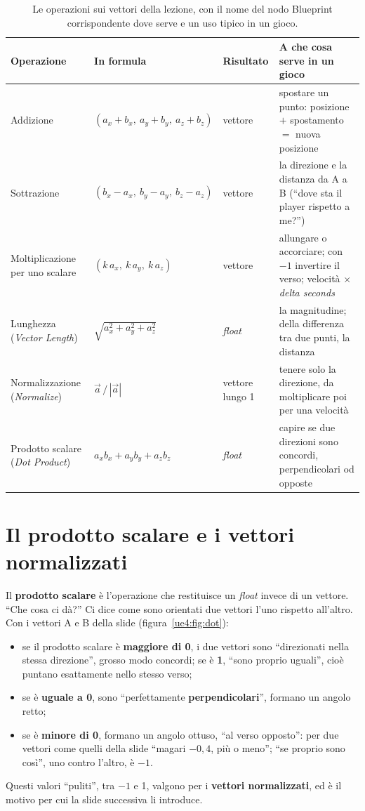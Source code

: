 \begin{table}[htbp]
\centering
\small
\begin{tabular}{@{}p{3.1cm}p{3.4cm}p{2.0cm}p{5.6cm}@{}}
\toprule
\textbf{Operazione} & \textbf{In formula} & \textbf{Risultato} &
\textbf{A che cosa serve in un gioco} \\
\midrule
Addizione & $(a_x+b_x,\ a_y+b_y,\ a_z+b_z)$ & vettore & spostare un punto: posizione
$+$ spostamento $=$ nuova posizione \\
Sottrazione & $(b_x-a_x,\ b_y-a_y,\ b_z-a_z)$ & vettore & la direzione e la distanza
da A a B (``dove sta il player rispetto a me?'') \\
Moltiplicazione per uno scalare & $(k\,a_x,\ k\,a_y,\ k\,a_z)$ & vettore & allungare o
accorciare; con $-1$ invertire il verso; velocità $\times$ \emph{delta seconds} \\
Lunghezza (\emph{Vector Length}) & $\sqrt{a_x^2+a_y^2+a_z^2}$ & \emph{float} & la
magnitudine; della differenza tra due punti, la distanza \\
Normalizzazione (\emph{Normalize}) & $\vec a \,/\, |\vec a|$ & vettore lungo 1 & tenere
solo la direzione, da moltiplicare poi per una velocità \\
Prodotto scalare (\emph{Dot Product}) & $a_x b_x + a_y b_y + a_z b_z$ & \emph{float} &
capire se due direzioni sono concordi, perpendicolari od opposte \\
\bottomrule
\end{tabular}
\caption{Le operazioni sui vettori della lezione, con il nome del nodo Blueprint
corrispondente dove serve e un uso tipico in un gioco.}
\label{ue4:tab:vettori}
\end{table}

\section{Il prodotto scalare e i vettori normalizzati}
\label{ue4:sec:dot}

Il \textbf{prodotto scalare} è l'operazione che restituisce un \emph{float} invece di un
vettore. ``Che cosa ci dà?'' Ci dice come sono orientati due vettori l'uno rispetto
all'altro. Con i vettori A e B della slide (figura~\ref{ue4:fig:dot}):
\begin{itemize}
  \item se il prodotto scalare è \textbf{maggiore di 0}, i due vettori sono
        ``direzionati nella stessa direzione'', grosso modo concordi; se è
        \textbf{1}, ``sono proprio uguali'', cioè puntano esattamente nello stesso
        verso;
  \item se è \textbf{uguale a 0}, sono ``perfettamente \textbf{perpendicolari}'',
        formano un angolo retto;
  \item se è \textbf{minore di 0}, formano un angolo ottuso, ``al verso opposto'': per
        due vettori come quelli della slide ``magari $-0{,}4$, più o meno''; ``se
        proprio sono così'', uno contro l'altro, è $-1$.
\end{itemize}
Questi valori ``puliti'', tra $-1$ e 1, valgono per i \textbf{vettori normalizzati}, ed
è il motivo per cui la slide successiva li introduce.

